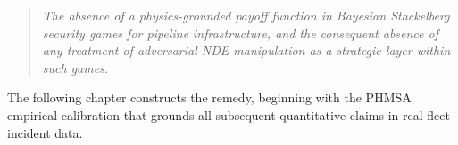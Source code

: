 \begin{quote}
  \textit{The absence of a physics-grounded payoff function in Bayesian
  Stackelberg security games for pipeline infrastructure, and the
  consequent absence of any treatment of adversarial NDE manipulation
  as a strategic layer within such games.}
\end{quote}

\noindent The following chapter constructs the remedy, beginning with
the PHMSA empirical calibration that grounds all subsequent quantitative
claims in real fleet incident data.
